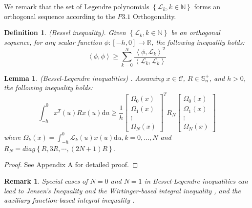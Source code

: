 \documentclass[a4paper]{cas-sc}
\newtheorem{lemma}[theorem]{Lemma}
\newtheorem*{proof}{Proof}
\newtheorem{remark}[theorem]{Remark}
\newtheorem{defi}[theorem]{Definition}
\begin{document}
We remark that the set of Legendre polynomials $\left\{ {{\mathcal{L}_k},k \in \mathbb{N}} \right\}$ forms an orthogonal sequence according to the $P3.1$ Orthogonality.

\begin{defi}
  (Bessel inequality). Given $\left\{ {{\mathcal{L}_k},k \in \mathbb{N}} \right\} $ be an orthogonal sequence, for any scalar function $\phi :\left[ { - h,0} \right] \to \mathbb{R} $, the following inequality holds:
  \begin{equation}
    \left\langle {\phi ,\phi } \right\rangle  \geqslant \sum\limits_{k = 0}^N {\frac{{{{\left\langle {\phi ,{\mathcal{L}_k}} \right\rangle }^2}}}{{\left\langle {{\mathcal{L}_k},{\mathcal{L}_k}} \right\rangle }}}
  \end{equation}
\end{defi}

\begin{lemma}
  \label{lemma5}
  (Bessel-Legendre inequalities) \citep{Lee2018}. Assuming $x \in \mathcal{C} $, $R \in \mathbb{S}_n^ +  $, and $h > 0$, the following inequality holds:
  \begin{equation}
    \int_{ - h}^0 {{x^T}} (u)Rx(u){\text{d}}u \geqslant \frac{1}{h}{\left[ {\begin{array}{*{20}{c}}
              {{\Omega _0}(x)} \\
              {{\Omega _1}(x)} \\
              \vdots           \\
              {{\Omega _N}(x)}
            \end{array}} \right]^T}{R_N}\left[ {\begin{array}{*{20}{c}}
            {{\Omega _0}(x)} \\
            {{\Omega _1}(x)} \\
            \vdots           \\
            {{\Omega _N}(x)}
          \end{array}} \right]
    \label{eqlemma5}
  \end{equation}
  where ${\Omega _k}(x) = \int_{ - h}^0 {{\mathcal{L}_k}} (u)x(u){\text{d}}u,k = 0, \ldots ,N$ and ${R_N} = diag\left\{ {R,3R, \cdots ,(2N + 1)R} \right\}$.
\end{lemma}
\begin{proof}
  See Appendix A for detailed proof.
\end{proof}

\begin{remark}
  Special cases of $N = 0 $ and $N = 1 $ in Bessel-Legendre inequalities can lead to Jensen's Inequality and the Wirtinger-based integral inequality \citep{Seuret2013}, and the auxiliary function-based integral inequality \citep{Park2015}.
\end{remark}
\end{document}
